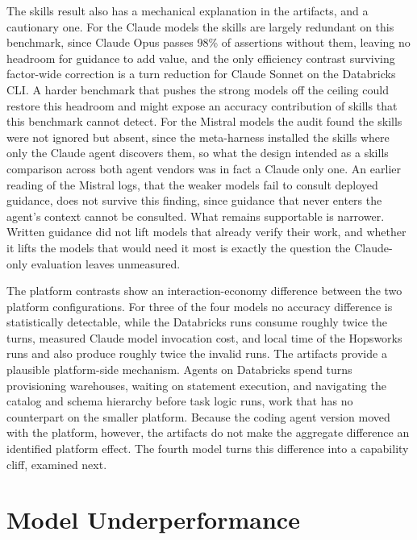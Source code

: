\documentclass[
english,                 %
bibtex,                  %
]{kththesis}
\numberwithin{listing}{chapter}
\begin{document}
The skills result also has a mechanical explanation in the artifacts, and a cautionary one. For the Claude models the skills are largely redundant on this benchmark, since Claude Opus passes 98\% of assertions without them, leaving no headroom for guidance to add value, and the only efficiency contrast surviving factor-wide correction is a turn reduction for Claude Sonnet on the Databricks \gls{CLI}. A harder benchmark that pushes the strong models off the ceiling could restore this headroom and might expose an accuracy contribution of skills that this benchmark cannot detect. For the Mistral models the audit found the skills were not ignored but absent, since the meta-harness installed the skills where only the Claude agent discovers them, so what the design intended as a skills comparison across both agent vendors was in fact a Claude only one. An earlier reading of the Mistral logs, that the weaker models fail to consult deployed guidance, does not survive this finding, since guidance that never enters the agent's context cannot be consulted. What remains supportable is narrower. Written guidance did not lift models that already verify their work, and whether it lifts the models that would need it most is exactly the question the Claude-only evaluation leaves unmeasured.

The platform contrasts show an interaction-economy difference between the two platform configurations. For three of the four models no accuracy difference is statistically detectable, while the Databricks runs consume roughly twice the turns, measured Claude model invocation cost, and local time of the Hopsworks runs and also produce roughly twice the invalid runs. The artifacts provide a plausible platform-side mechanism. Agents on Databricks spend turns provisioning warehouses, waiting on statement execution, and navigating the catalog and schema hierarchy before task logic runs, work that has no counterpart on the smaller platform. Because the coding agent version moved with the platform, however, the artifacts do not make the aggregate difference an identified platform effect. The fourth model turns this difference into a capability cliff, examined next.

\section{Model Underperformance}
\label{sec:disc_model_underperformance}
\glsresetall
\end{document}
